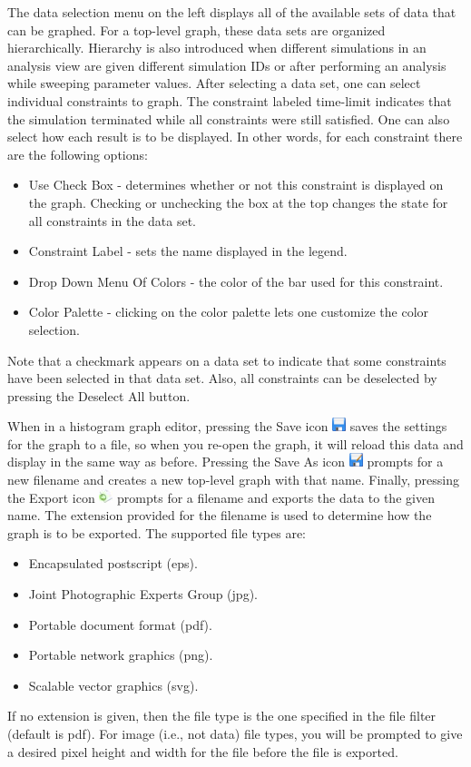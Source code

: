 \documentclass[titlepage,11pt]{article}
\begin{document}
The data selection menu on the left displays all of the available sets of data that can be graphed.  For a top-level graph, these data sets are organized hierarchically.  Hierarchy is also introduced when different simulations in an analysis view are given different simulation IDs or after performing an analysis while sweeping parameter values.  After selecting a data set, one can select individual constraints to graph.  The constraint labeled time-limit indicates that the simulation terminated while all constraints were still satisfied.  One can also select how each result is to be displayed.  In other words, for each constraint there are the following options: 
\begin{itemize}
\item Use Check Box - determines whether or not this constraint is displayed on the graph.  Checking or 
unchecking the box at the top changes the state for all constraints in the data set. 
\item Constraint Label - sets the name displayed in the legend. 
\item Drop Down Menu Of Colors - the color of the bar used for this constraint.
\item Color Palette - clicking on the color palette lets one customize the color selection. 
\end{itemize}
Note that a checkmark appears on a data set to indicate that some constraints have been selected in that data set.  Also, all constraints can be deselected by pressing the Deselect All button.

When in a histogram graph editor, pressing the Save icon \includegraphics{../gui/icons/save} saves the settings for the graph to a file, so when you re-open the graph, it will reload this data and display in the same way as before.  Pressing the Save As icon \includegraphics{../gui/icons/saveas} prompts for a new filename and creates a new top-level graph with that name.  Finally, pressing the Export icon \includegraphics{../gui/icons/export} prompts for a filename and exports the data to the given name.  The extension provided for the filename is used to determine how the graph is to be exported. The supported file types are: 
\begin{itemize}
\item Encapsulated postscript (eps). 
\item Joint Photographic Experts Group (jpg). 
\item Portable document format (pdf).
\item Portable network graphics (png). 
\item Scalable vector graphics (svg).
\end{itemize}
If no extension is given, then the file type is the one specified in the file filter (default is pdf).  For image (i.e.,
not data) file types, you will be prompted to give a desired pixel height and width for the file before the file is exported. 
\end{document}
